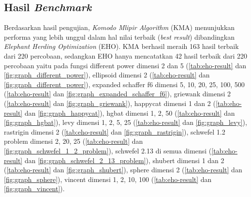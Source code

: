 \subsection{Hasil \textit{Benchmark}}
Berdasarkan hasil pengujian, \textit{Komodo Mlipir Algorithm} (KMA) menunjukkan performa yang lebih unggul dalam hal nilai terbaik (\textit{best result}) dibandingkan \textit{Elephant Herding Optimization} (EHO). KMA berhasil meraih 163 hasil terbaik dari 220 percobaan, sedangkan EHO hanya mencatatkan 42 hasil terbaik dari 220 percobaan yaitu pada fungsi different power dimensi 2 dan 5 (\cref{tab:eho-result} dan \cref{fig:graph_different_power}), ellipsoid dimensi 2 (\cref{tab:eho-result} dan \cref{fig:graph_different_power}), expanded schaffer f6 dimensi 5, 10, 20, 25, 100, 500 (\cref{tab:eho-result} dan \cref{fig:graph_expanded_schaffer_f6}), griewank dimensi 2 (\cref{tab:eho-result} dan \cref{fig:graph_griewank}), happycat dimensi 1 dan 2 (\cref{tab:eho-result} dan \cref{fig:graph_happycat}), hgbat dimensi 1, 2, 50 (\cref{tab:eho-result} dan \cref{fig:graph_hgbat}), levy dimensi 1, 2, 5, 25 (\cref{tab:eho-result} dan \cref{fig:graph_levy}), rastrigin dimensi 2 (\cref{tab:eho-result} dan \cref{fig:graph_rastrigin}), schwefel 1.2 problem dimensi 2, 20, 25 (\cref{tab:eho-result} dan \cref{fig:graph_schwefel_1_2_problem}), schwefel 2.13 di semua dimensi (\cref{tab:eho-result} dan \cref{fig:graph_schwefel_2_13_problem}), shubert dimensi 1 dan 2 (\cref{tab:eho-result} dan \cref{fig:graph_shubert}), sphere dimensi 2 (\cref{tab:eho-result} dan \cref{fig:graph_sphere}), vincent dimensi 1, 2, 10, 100 (\cref{tab:eho-result} dan \cref{fig:graph_vincent}).

